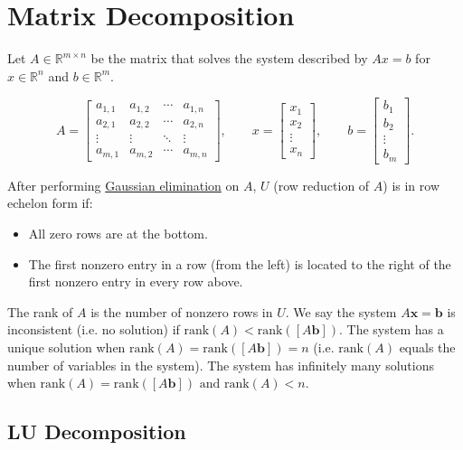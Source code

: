 \documentclass[../main.tex]{subfiles}
\begin{document}
\section{Matrix Decomposition}
Let $A \in \mathbb{R}^{m \times n}$ be the matrix that solves the system described by $Ax = b$ for $x \in \mathbb{R}^n$ and $b \in \mathbb{R}^m$.

\[
    A= \begin{bmatrix}
        a_{1,1} & a_{1,2} & \cdots & a_{1,n}\\
        a_{2,1} & a_{2,2} & \cdots & a_{2,n}\\
        \vdots  & \vdots  & \ddots & \vdots\\
        a_{m,1} & a_{m,2} & \cdots & a_{m,n}
    \end{bmatrix},
    \qquad
    x= \begin{bmatrix}
        x_1\\
        x_2\\
        \vdots\\
        x_n
    \end{bmatrix},
    \qquad
    b= \begin{bmatrix}
        b_1\\
        b_2\\
        \vdots\\
        b_m
    \end{bmatrix}.
\]

After performing \href{https://en.wikipedia.org/wiki/Gaussian_elimination}{Gaussian elimination} on $A$, $U$ (row reduction of $A$) is in row echelon form if:

\begin{itemize}
    \item All zero rows are at the bottom.
    \item The first nonzero entry in a row (from the left) is located to the right of the first nonzero entry in every row above.
\end{itemize}

The rank of $A$ is the number of nonzero rows in $U$. We say the system $A\mathbf{x} = \mathbf{b}$ is inconsistent (i.e. no solution) if $\text{rank}(A) < \text{rank}([A\mathbf{b}])$. The system has a unique solution when $\text{rank}(A) = \text{rank}([A\mathbf{b}]) = n$ (i.e. $\text{rank}(A)$ equals the number of variables in the system). The system has infinitely many solutions when $\text{rank}(A) = \text{rank}([A\mathbf{b}]) \text{ and rank}(A) < n$.

\subsection{LU Decomposition}
\end{document}
